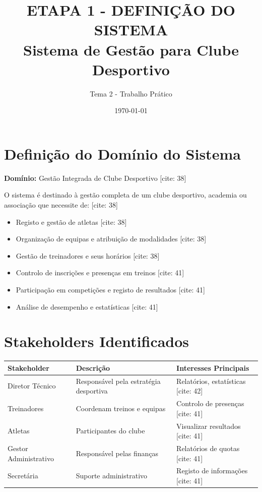 \documentclass[12pt]{article}
\title{\textbf{ETAPA 1 - DEFINIÇÃO DO SISTEMA} \\
Sistema de Gestão para Clube Desportivo}
\author{Tema 2 - Trabalho Prático}
\date{\today}
\begin{document}
\maketitle

\section{Definição do Domínio do Sistema}

\textbf{Domínio:} Gestão Integrada de Clube Desportivo [cite: 38]

O sistema é destinado à gestão completa de um clube desportivo, academia ou associação que necessite de: [cite: 38]
\begin{itemize}
    \item Registo e gestão de atletas [cite: 38]
    \item Organização de equipas e atribuição de modalidades [cite: 38]
    \item Gestão de treinadores e seus horários [cite: 38]
    \item Controlo de inscrições e presenças em treinos [cite: 41]
    \item Participação em competições e registo de resultados [cite: 41]
    \item Análise de desempenho e estatísticas [cite: 41]
\end{itemize}

\section{Stakeholders Identificados}

\begin{center}
\begin{tabular}{|l|l|l|}
\hline
\textbf{Stakeholder} & \textbf{Descrição} & \textbf{Interesses Principais} \\
\hline
Diretor Técnico & Responsável pela estratégia desportiva & Relatórios, estatísticas [cite: 42] \\
\hline
Treinadores & Coordenam treinos e equipas & Controlo de presenças [cite: 41] \\
\hline
Atletas & Participantes do clube & Visualizar resultados [cite: 41] \\
\hline
Gestor Administrativo & Responsável pelas finanças & Relatórios de quotas [cite: 41] \\
\hline
Secretária & Suporte administrativo & Registo de informações [cite: 41] \\
\hline
\end{tabular}
\end{center}
\end{document}
